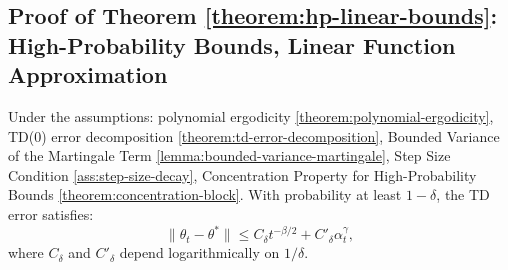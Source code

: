 \subsection{Proof of Theorem \ref{theorem:hp-linear-bounds}: High-Probability Bounds, Linear Function Approximation}
\label{app:proof-hp-linear-bounds}

\begin{theoremapp*}
Under the assumptions: polynomial ergodicity \ref{theorem:polynomial-ergodicity}, TD(0) error decomposition \ref{theorem:td-error-decomposition}, Bounded Variance of the Martingale Term \ref{lemma:bounded-variance-martingale}, Step Size Condition \ref{ass:step-size-decay}, Concentration Property for High-Probability Bounds \ref{theorem:concentration-block}. With probability at least \(1 - \delta\), the TD error satisfies:
\[
\|\theta_t - \theta^*\| \leq C_\delta t^{-\beta/2} + C'_\delta \alpha_t^\gamma,
\]
where \(C_\delta\) and \(C'_\delta\) depend logarithmically on \(1/\delta\).
\end{theoremapp*}

